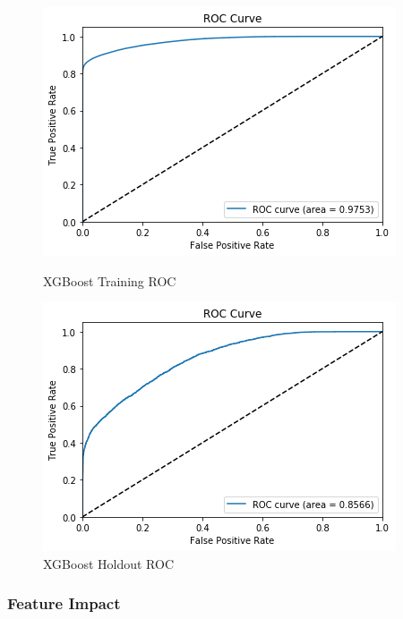 \begin{figure}[!htb]
\centering
  \begin{minipage}{0.5\textwidth}
    \includegraphics[width=\textwidth]{images/XGB_TR_AUC.png}
    \caption{XGBoost Training ROC}
    \label{fig:xgb_tr}
  \end{minipage}%
  \begin{minipage}{0.5\textwidth}
    \includegraphics[width=\textwidth]{images/XGB_TE_AUC.png}
    \caption{XGBoost Holdout ROC}
    \label{fig:xgb_te}
  \end{minipage}
\end{figure}


\subsubsection{Feature Impact}

